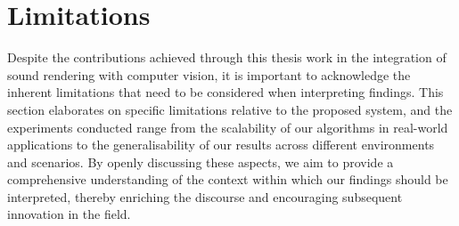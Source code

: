 \section{Limitations}
Despite the contributions achieved through this thesis work in the integration of sound rendering with computer vision, it is important to acknowledge the inherent limitations that need to be considered when interpreting findings. This section elaborates on specific limitations relative to the proposed system, and the experiments conducted range from the scalability of our algorithms in real-world applications to the generalisability of our results across different environments and scenarios. By openly discussing these aspects, we aim to provide a comprehensive understanding of the context within which our findings should be interpreted, thereby enriching the discourse and encouraging subsequent innovation in the field.

